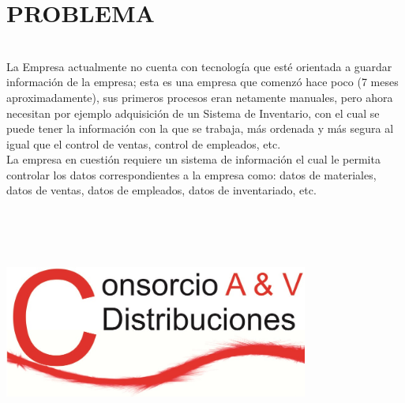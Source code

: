 \section{PROBLEMA} 
\begin{flushleft}
\textbf{}\\
La Empresa actualmente no cuenta con tecnología que esté orientada a guardar información de la empresa; esta es una empresa que comenzó hace poco (7 meses aproximadamente), sus primeros procesos eran netamente manuales, pero ahora necesitan por ejemplo adquisición de un Sistema de Inventario, con el cual se puede tener la información con la que se trabaja, más ordenada y más segura al igual que el control de ventas, control de empleados, etc.
\textbf{}\\
La empresa en cuestión requiere un sistema de información el cual le permita controlar los datos correspondientes a la empresa como: datos de materiales, datos de ventas, datos de empleados, datos de inventariado, etc.

\textbf{}\\
\textbf{}\\
\textbf{}\\
\begin{center}
	\includegraphics[width=10cm]{./Imagenes/img1.jpg} 
	\end{center}








\end{flushleft}